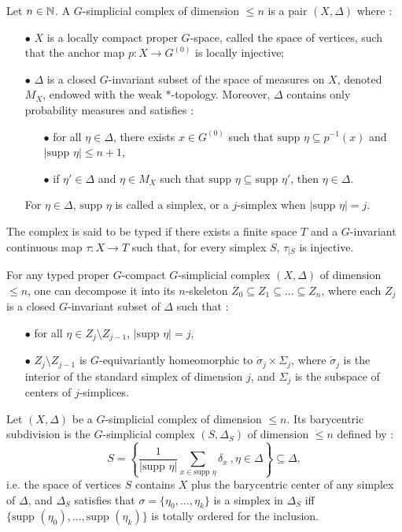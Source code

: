 \begin{definition} \label{Gcomplex}
Let $n\in\mathbb N$. A $G$-simplicial complex of dimension $\leq n$ is a pair $(X,\Delta)$ where :
\begin{itemize}
\item[$\bullet$] $X$ is a locally compact proper $G$-space, called the space of vertices, such that the anchor map $p : X\rightarrow G^{(0)}$ is locally injective;
\item[$\bullet$] $\Delta$ is a closed $G$-invariant subset of the space of measures on $X$, denoted $M_X$, endowed with the weak $*$-topology. Moreover, $\Delta$ contains only probability measures and satisfies :
\begin{itemize}
\item[$\bullet$] for all $\eta\in\Delta$, there exists $x\in G^ {(0)}$ such that $\text{supp }\eta \subseteq p^{-1}(x)$ and $|\text{supp }\eta|\leq n+1$,
\item[$\bullet$] if $\eta' \in \Delta$ and $\eta\in M_X$ such that $\text{supp }\eta \subseteq \text{supp }\eta'$, then $\eta\in \Delta$.
\end{itemize}
For $\eta\in \Delta$, $\text{supp }\eta$ is called a simplex, or a $j$-simplex when $|\text{supp }\eta | = j$.
\end{itemize}
The complex is said to be typed if there exists a finite space $T$ and a $G$-invariant continuous map $\tau : X\rightarrow T$ such that, for every simplex $S$, $\tau_{|S}$ is injective.  
\end{definition}

For any typed proper $G$-compact $G$-simplicial complex $(X,\Delta)$ of dimension $\leq n$, one can decompose it into its $n$-skeleton $Z_0\subseteq Z_1 \subseteq ... \subseteq Z_n$, where each $Z_j$ is a closed $G$-invariant subset of $\Delta$ such that :
\begin{itemize}
\item[$\bullet$] for all $\eta \in Z_j \setminus Z_{j-1}$, $|\text{supp }\eta|= j$,
\item[$\bullet$] $Z_j \setminus Z_{j-1}$ is $G$-equivariantly homeomorphic to $\mathring\sigma_j \times \Sigma_j$, where $\mathring\sigma_j $ is the interior of the standard simplex of dimension $j$, and $\Sigma_j$ is the subspace of centers of $j$-simplices.
\end{itemize}

\begin{definition}
Let $(X,\Delta)$ be a $G$-simplicial complex of dimension $\leq n$. Its barycentric subdivision is the $G$-simplicial complex $(S,\Delta_S)$ of dimension $\leq n$ defined by :
\[S = \left\{ \frac{1}{|\text{supp } \eta|}\sum_{x\in \text{supp } \eta} \delta_x\ ,\eta\in \Delta \right\} \subseteq \Delta ,\]
i.e. the space of vertices $S$ contains $X$ plus the barycentric center of any simplex of $\Delta$, and $\Delta_S $ satisfies that $\sigma = \{ \eta_0, ...,\eta_k\}$ is a simplex in $\Delta_S$ iff $\{\text{supp }(\eta_0),...,\text{supp }(\eta_k) \}$ is totally ordered for the inclusion. %
\end{definition}

